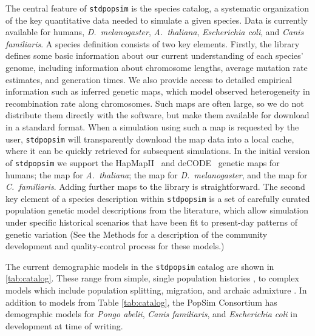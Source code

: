 \documentclass[12pt,halfline,a4paper]{ouparticle}
\newcommand{\stdpopsim}{\texttt{stdpopsim}\xspace}
\begin{document}
The central feature of \stdpopsim is the species catalog, a systematic organization
of the key quantitative data needed to simulate a given species. 
Data is currently available for humans,
\textit{D.~melanogaster}, \textit{A.~thaliana},
\textit{Escherichia coli}, and \textit{Canis familiaris}.
A species definition consists of two key elements.
Firstly, the library defines some basic information about our current understanding of each
species' genome, including information about chromosome
lengths, average mutation rate estimates, and generation times.
We also provide access to detailed empirical information such as inferred genetic maps,
which model observed heterogeneity in recombination rate along chromosomes.
Such maps are often large,
so we do not distribute them directly with the software, but make them available
for download in a standard format.
When a simulation using such a map is requested by the user,
\stdpopsim will transparently download the map data into a local cache,
where it can be quickly retrieved for subsequent simulations.
In the initial version of \stdpopsim we support
the HapMapII~\citep{international2007second} and
deCODE~\citep{kong2010fine} genetic maps for humans;
the \cite{salome2011recombination} map for \textit{A.~thaliana};
the \cite{comeron2012many} map for \textit{D.~melanogaster},
and the \cite{campbell2016pedigree} map for \textit{C.~familiaris}.
Adding further maps to the library is straightforward.
The second key element of a species description
within \stdpopsim is a set of carefully curated population genetic model
descriptions from the literature, which allow simulation under
specific historical scenarios that have been fit to present-day patterns of
genetic variation (See the Methods for a description of the community
development and quality-control process for these models.)

The current demographic models in the \stdpopsim catalog are shown in \autoref{tab:catalog}.
These range from
simple, single population histories \cite[e.g.,][]{sheehan2016deep},
to complex models which include population splitting, migration, and archaic
admixture \cite[e.g.,][]{ragsdale2019models}.
In addition to models from Table \autoref{tab:catalog}, 
the PopSim Consortium has demographic models for \textit{Pongo abelii}, \textit{Canis familiaris}, and \textit{Escherichia coli} in development at time of writing.
\end{document}
